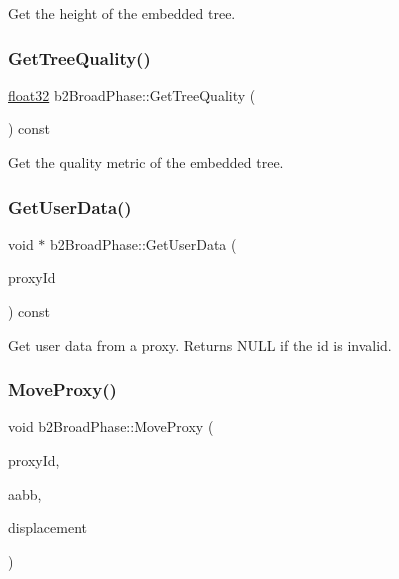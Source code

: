 Get the height of the embedded tree. 

\mbox{\label{classb2_broad_phase_a4e7d2f5d16ac100b18511e6a42e758bf}} 
\subsubsection{\texorpdfstring{GetTreeQuality()}{GetTreeQuality()}}
{\footnotesize\ttfamily \mbox{\hyperlink{b2_settings_8h_aacdc525d6f7bddb3ae95d5c311bd06a1}{float32}} b2\+Broad\+Phase\+::\+Get\+Tree\+Quality (\begin{DoxyParamCaption}{ }\end{DoxyParamCaption}) const\hspace{0.3cm}{\ttfamily [inline]}}



Get the quality metric of the embedded tree. 

\mbox{\label{classb2_broad_phase_a3b85893e3cf18b43087cb96b0b9076d1}} 
\subsubsection{\texorpdfstring{GetUserData()}{GetUserData()}}
{\footnotesize\ttfamily void $\ast$ b2\+Broad\+Phase\+::\+Get\+User\+Data (\begin{DoxyParamCaption}\item[{\mbox{\hyperlink{b2_settings_8h_a43d43196463bde49cb067f5c20ab8481}{int32}}}]{proxy\+Id }\end{DoxyParamCaption}) const\hspace{0.3cm}{\ttfamily [inline]}}



Get user data from a proxy. Returns N\+U\+LL if the id is invalid. 

\mbox{\label{classb2_broad_phase_a01dc18a19c2b5d0cc1d9cd8c8554234c}} 
\subsubsection{\texorpdfstring{MoveProxy()}{MoveProxy()}}
{\footnotesize\ttfamily void b2\+Broad\+Phase\+::\+Move\+Proxy (\begin{DoxyParamCaption}\item[{\mbox{\hyperlink{b2_settings_8h_a43d43196463bde49cb067f5c20ab8481}{int32}}}]{proxy\+Id,  }\item[{const \mbox{\hyperlink{structb2_a_a_b_b}{b2\+A\+A\+BB}} \&}]{aabb,  }\item[{const \mbox{\hyperlink{structb2_vec2}{b2\+Vec2}} \&}]{displacement }\end{DoxyParamCaption})}

